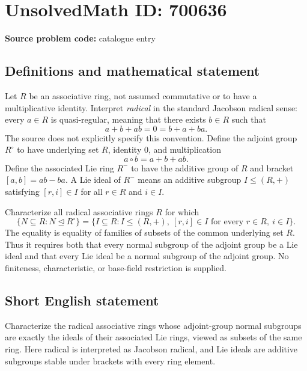 \documentclass[11pt]{article}
\begin{document}
\section*{UnsolvedMath ID: 700636}
\textbf{Source problem code:} catalogue entry
\subsection{Definitions and mathematical statement}
Let \(R\) be an associative ring, not assumed commutative or to have a multiplicative identity. Interpret \emph{radical} in the standard Jacobson radical sense: every \(a\in R\) is quasi-regular, meaning that there exists \(b\in R\) such that
\[
a+b+ab=0=b+a+ba.
\]
The source does not explicitly specify this convention. Define the adjoint group \(R^{\circ}\) to have underlying set \(R\), identity \(0\), and multiplication
\[
a\circ b=a+b+ab.
\]
Define the associated Lie ring \(R^{-}\) to have the additive group of \(R\) and bracket \([a,b]=ab-ba\). A Lie ideal of \(R^{-}\) means an additive subgroup \(I\leq (R,+)\) satisfying \([r,i]\in I\) for all \(r\in R\) and \(i\in I\).

Characterize all radical associative rings \(R\) for which
\[
\bigl\{N\subseteq R:N\trianglelefteq R^{\circ}\bigr\}
=
\bigl\{I\subseteq R:I\leq(R,+),\ [r,i]\in I\text{ for every }r\in R,\ i\in I\bigr\}.
\]
The equality is equality of families of subsets of the common underlying set \(R\). Thus it requires both that every normal subgroup of the adjoint group be a Lie ideal and that every Lie ideal be a normal subgroup of the adjoint group. No finiteness, characteristic, or base-field restriction is supplied.
\subsection{Short English statement}
Characterize the radical associative rings whose adjoint-group normal subgroups are exactly the ideals of their associated Lie rings, viewed as subsets of the same ring. Here radical is interpreted as Jacobson radical, and Lie ideals are additive subgroups stable under brackets with every ring element.
\end{document}
